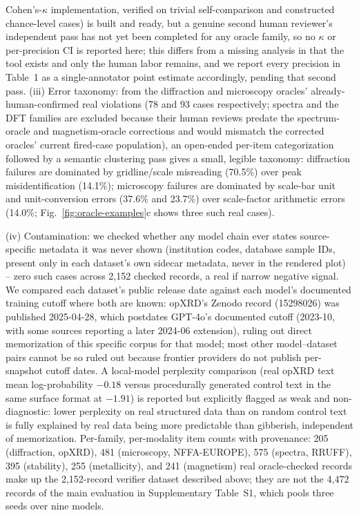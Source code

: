 \documentclass[pdflatex,sn-nature]{sn-jnl}
\begin{document}
Cohen's-$\kappa$ implementation, verified on trivial self-comparison and constructed
chance-level cases) is built and ready, but a genuine second human reviewer's independent
pass has not yet been completed for any oracle family, so no $\kappa$ or per-precision CI
is reported here; this differs from a missing analysis in that the tool exists and only the
human labor remains, and we report every precision in Table~1 as a single-annotator point
estimate accordingly, pending that second pass. (iii) Error taxonomy: from the diffraction and microscopy oracles'
already-human-confirmed real violations (78 and 93 cases respectively; spectra and the DFT
families are excluded because their human reviews predate the spectrum-oracle and
magnetism-oracle corrections and would mismatch the corrected oracles' current fired-case
population), an open-ended per-item categorization followed by a semantic clustering pass
gives a small, legible taxonomy: diffraction failures are dominated by gridline/scale
misreading (70.5\%) over peak misidentification (14.1\%); microscopy failures are
dominated by scale-bar unit and unit-conversion errors (37.6\% and 23.7\%) over scale-factor
arithmetic errors (14.0\%; Fig.~\ref{fig:oracle-examples}c shows three such real cases).

(iv) Contamination: we checked whether any model chain ever
states source-specific metadata it was never shown (institution codes, database sample
IDs, present only in each dataset's own sidecar metadata, never in the rendered plot) --
zero such cases across 2{,}152 checked records, a real if narrow negative signal. We
compared each dataset's public release date against each model's documented training
cutoff where both are known: opXRD's Zenodo record (15298026) was published 2025-04-28,
which postdates GPT-4o's documented cutoff (2023-10, with some sources reporting a later
2024-06 extension), ruling out direct memorization of this specific corpus for that model;
most other model--dataset pairs cannot be so ruled out because frontier providers do not
publish per-snapshot cutoff dates. A local-model perplexity comparison (real opXRD text
mean log-probability $-0.18$ versus procedurally generated control text in the same surface
format at $-1.91$) is reported but explicitly flagged as weak and non-diagnostic: lower
perplexity on real structured data than on random control text is fully explained by real
data being more predictable than gibberish, independent of memorization. Per-family,
per-modality item counts with provenance: 205 (diffraction, opXRD), 481 (microscopy,
NFFA-EUROPE), 575 (spectra, RRUFF), 395 (stability), 255 (metallicity), and 241 (magnetism)
real oracle-checked records make up the 2{,}152-record verifier dataset described above;
they are not the 4{,}472 records of the main evaluation in Supplementary Table~S1, which
pools three seeds over nine models.
\end{document}
